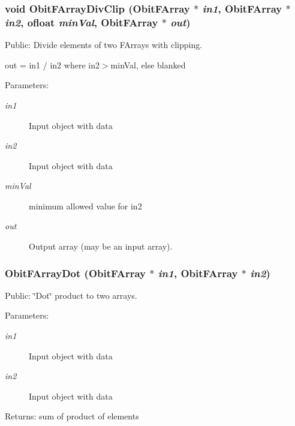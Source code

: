 \subsubsection{\setlength{\rightskip}{0pt plus 5cm}void Obit\-FArray\-Div\-Clip ({\bf Obit\-FArray} $\ast$ {\em in1}, {\bf Obit\-FArray} $\ast$ {\em in2}, {\bf ofloat} {\em min\-Val}, {\bf Obit\-FArray} $\ast$ {\em out})}\label{ObitFArray_8h_a97}


Public: Divide elements of two FArrays with clipping. 

out = in1 / in2 where in2$>$min\-Val, else blanked \begin{Desc}
\item[Parameters:]
\begin{description}
\item[{\em in1}]Input object with data \item[{\em in2}]Input object with data \item[{\em min\-Val}]minimum allowed value for in2 \item[{\em out}]Output array (may be an input array). \end{description}
\end{Desc}
\subsubsection{ Obit\-FArray\-Dot ({\bf Obit\-FArray} $\ast$ {\em in1}, {\bf Obit\-FArray} $\ast$ {\em in2})}\label{ObitFArray_8h_a98}


Public: \char`\"{}Dot\char`\"{} product to two arrays. 

\begin{Desc}
\item[Parameters:]
\begin{description}
\item[{\em in1}]Input object with data \item[{\em in2}]Input object with data \end{description}
\end{Desc}
\begin{Desc}
\item[Returns:]sum of product of elements \end{Desc}
